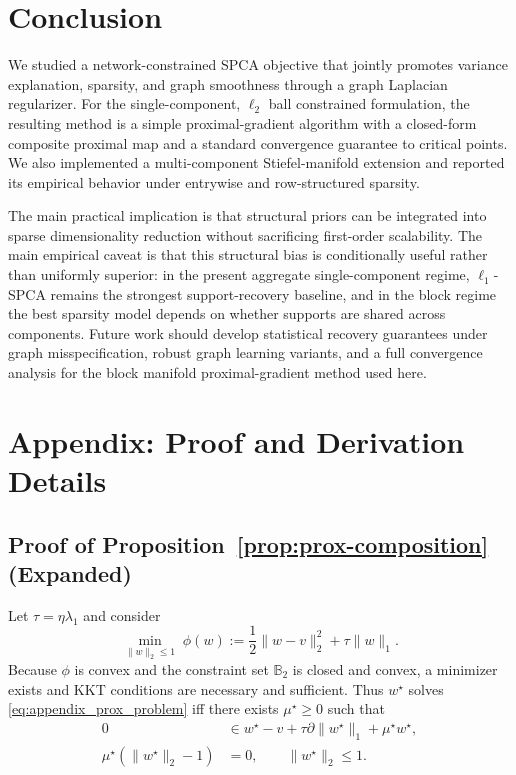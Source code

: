 \documentclass[10pt,twocolumn,letterpaper]{article}
\theoremstyle{definition}
\begin{document}
\section{Conclusion}
We studied a network-constrained SPCA objective that jointly promotes variance explanation, sparsity, and graph smoothness through a graph Laplacian regularizer. For the single-component, $\ell_2$ ball constrained formulation, the resulting method is a simple proximal-gradient algorithm with a closed-form composite proximal map and a standard convergence guarantee to critical points. We also implemented a multi-component Stiefel-manifold extension and reported its empirical behavior under entrywise and row-structured sparsity.

The main practical implication is that structural priors can be integrated into sparse dimensionality reduction without sacrificing first-order scalability. The main empirical caveat is that this structural bias is conditionally useful rather than uniformly superior: in the present aggregate single-component regime, $\ell_1$-SPCA remains the strongest support-recovery baseline, and in the block regime the best sparsity model depends on whether supports are shared across components. Future work should develop statistical recovery guarantees under graph misspecification, robust graph learning variants, and a full convergence analysis for the block manifold proximal-gradient method used here.

\appendix

\section{Appendix: Proof and Derivation Details}
\subsection{Proof of Proposition~\ref{prop:prox-composition} (Expanded)}
Let $\tau=\eta\lambda_1$ and consider
\begin{equation}
\label{eq:appendix_prox_problem}
\min_{\|w\|_2\le 1}\; \phi(w):=\frac12\|w-v\|_2^2+\tau\|w\|_1.
\end{equation}
Because $\phi$ is convex and the constraint set $\mathbb{B}_2$ is closed and convex, a minimizer exists and KKT conditions are necessary and sufficient. Thus $w^\star$ solves \eqref{eq:appendix_prox_problem} iff there exists $\mu^\star\ge 0$ such that
\begin{align}
0 &\in w^\star - v + \tau \partial\|w^\star\|_1 + \mu^\star w^\star, \label{eq:kkt_stationarity}\\
\mu^\star(\|w^\star\|_2-1)&=0, \qquad \|w^\star\|_2\le 1. \label{eq:kkt_complementarity}
\end{align}
\end{document}
